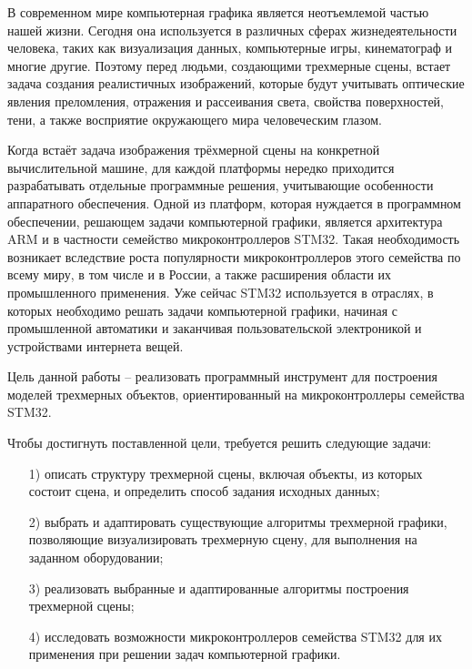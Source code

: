 \Introduction


В современном мире компьютерная графика является неотъемлемой частью нашей жизни. Сегодня она используется в различных сферах 
жизнедеятельности человека, таких как визуализация данных, компьютерные игры, кинематограф и многие другие. Поэтому перед людьми, 
создающими трехмерные сцены, встает задача создания реалистичных изображений, которые будут учитывать оптические явления преломления, 
отражения и рассеивания света, свойства поверхностей, тени, а также восприятие окружающего мира человеческим глазом.

Когда встаёт задача изображения трёхмерной сцены на конкретной вычислительной машине, для каждой платформы нередко приходится разрабатывать 
отдельные программные решения, учитывающие особенности аппаратного обеспечения. Одной из платформ, которая нуждается в программном 
обеспечении, решающем задачи компьютерной графики, является архитектура ARM и в частности семейство микроконтроллеров STM32. Такая 
необходимость возникает вследствие роста популярности микроконтроллеров этого семейства по всему миру, в том числе и в России, а также 
расширения области их промышленного применения. Уже сейчас STM32 используется в отраслях, в которых необходимо решать задачи компьютерной 
графики, начиная с промышленной автоматики и заканчивая пользовательской электроникой и устройствами интернета вещей.

Цель данной работы – реализовать программный инструмент для построения моделей трехмерных объектов, ориентированный на микроконтроллеры 
семейства STM32.

Чтобы достигнуть поставленной цели, требуется решить следующие задачи:
\begin{enumerate}
	\item[1)] описать структуру трехмерной сцены, включая объекты, из которых состоит сцена, и определить способ задания исходных данных;
	\item[2)] выбрать и адаптировать существующие алгоритмы трехмерной графики, позволяющие визуализировать трехмерную сцену, для выполнения на заданном оборудовании;
	\item[3)] реализовать выбранные и адаптированные алгоритмы построения трехмерной сцены;
	\item[4)] исследовать возможности микроконтроллеров семейства STM32 для их применения при решении задач компьютерной графики. 
\end{enumerate}

